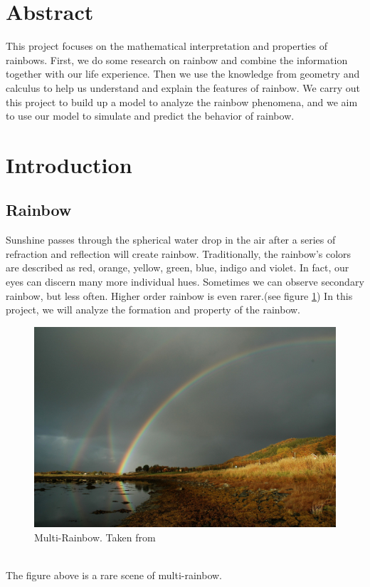 \documentclass{article}
\begin{document}
\begin{spacing}{1.5}
\section*{Abstract}
This project focuses on the mathematical interpretation and properties of rainbows. First, we do some research on rainbow and combine the information together with our life experience. Then we use the knowledge from geometry and calculus to help us understand and explain the features of rainbow. We carry out this project to build up a model to analyze the rainbow phenomena, and we aim to use our model to simulate and predict the behavior of rainbow.
\newpage
\tableofcontents
\newpage
\section{Introduction}
\subsection{Rainbow}
Sunshine passes through the spherical water drop in the air after a series of refraction and reflection will create rainbow. Traditionally, the rainbow's colors are described as red, orange, yellow, green, blue, indigo and violet. In fact, our eyes can discern many more individual hues. Sometimes we can observe secondary rainbow, but less often. Higher order rainbow is even rarer.(see figure \ref{rainbow}) In this project, we will analyze the formation and property of the rainbow.\\
\begin{figure}[!htb]
\centering
\includegraphics[width=12cm]{rainbow.jpg}
\caption{Multi-Rainbow. Taken from \cite{Rainbow}}
\label{rainbow}
\end{figure}
\\
The figure above is a rare scene of multi-rainbow.\\
\\

\end{spacing}
\end{document}
